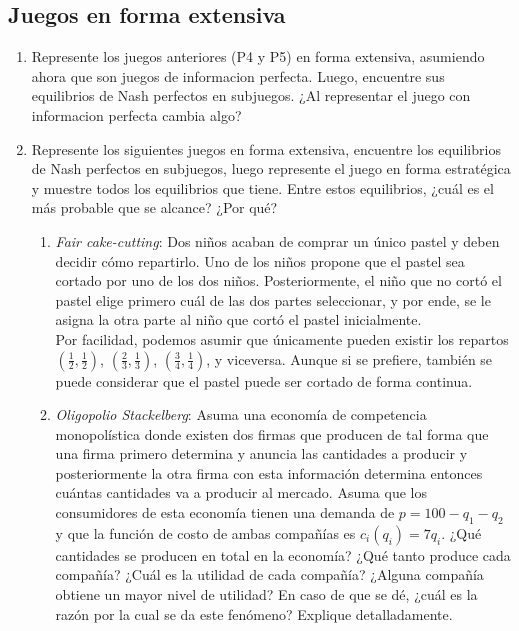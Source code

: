 \documentclass[11pt]{article}
\begin{document}
\begin{flushleft}
\section{Juegos en forma extensiva}

\begin{enumerate}[label=\Alph*)]
    \item Represente los juegos anteriores (P4 y P5) en forma extensiva, asumiendo ahora que son juegos de informacion perfecta. Luego, encuentre sus equilibrios de Nash perfectos en subjuegos. ¿Al representar el juego con informacion perfecta cambia algo?\\
    \item \begin{flushleft}
    Represente los siguientes juegos en forma extensiva, encuentre los equilibrios de Nash perfectos en subjuegos, luego represente el juego en forma estratégica y muestre todos los equilibrios que tiene. Entre estos equilibrios, ¿cuál es el más probable que se alcance? ¿Por qué?
\end{flushleft}

\begin{enumerate}[label=\roman*)]
    \item \textit{Fair cake-cutting}: Dos niños acaban de comprar un único pastel y deben decidir cómo repartirlo. Uno de los niños propone que el pastel sea cortado por uno de los dos niños. Posteriormente, el niño que no cortó el pastel elige primero cuál de las dos partes seleccionar, y por ende, se le asigna la otra parte al niño que cortó el pastel inicialmente.\\
    Por facilidad, podemos asumir que únicamente pueden existir los repartos $(\frac{1}{2},\frac{1}{2})$, $(\frac{2}{3},\frac{1}{3})$, $(\frac{3}{4},\frac{1}{4})$, y viceversa. Aunque si se prefiere, también se puede considerar que el pastel puede ser cortado de forma continua.
    \item \textit{Oligopolio Stackelberg}: Asuma una economía de competencia monopolística donde existen dos firmas que producen de tal forma que una firma primero determina y anuncia las cantidades a producir y posteriormente la otra firma con esta información determina entonces cuántas cantidades va a producir al mercado. Asuma que los consumidores de esta economía tienen una demanda de $p=100-q_1-q_2$ y que la función de costo de ambas compañías es $c_i(q_i)=7q_i$. ¿Qué cantidades se producen en total en la economía? ¿Qué tanto produce cada compañía? ¿Cuál es la utilidad de cada compañía? ¿Alguna compañía obtiene un mayor nivel de utilidad? En caso de que se dé, ¿cuál es la razón por la cual se da este fenómeno? Explique detalladamente.
\end{enumerate}
\end{enumerate}

\end{flushleft}
\newpage
\medskip

\nocite{*}
 

\newpage
\end{document}
